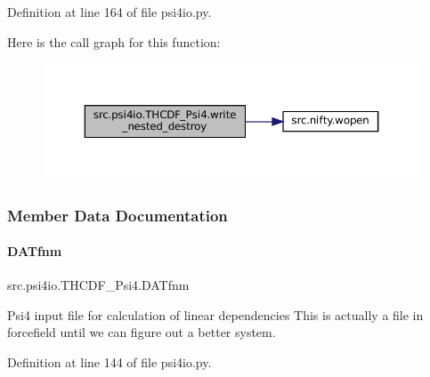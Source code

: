 Definition at line 164 of file psi4io.\+py.

Here is the call graph for this function\+:
\nopagebreak
\begin{figure}[H]
\begin{center}
\leavevmode
\includegraphics[width=350pt]{classsrc_1_1psi4io_1_1THCDF__Psi4_a4fb94880d038f875460abd67e18bdf43_cgraph}
\end{center}
\end{figure}


\subsubsection{Member Data Documentation}
\mbox{\label{classsrc_1_1psi4io_1_1THCDF__Psi4_a25b5e4a9c2d9d771d419fcdf0803a08a}} 
\paragraph{\texorpdfstring{D\+A\+Tfnm}{DATfnm}}
{\footnotesize\ttfamily src.\+psi4io.\+T\+H\+C\+D\+F\+\_\+\+Psi4.\+D\+A\+Tfnm}



Psi4 input file for calculation of linear dependencies This is actually a file in \textquotesingle{}forcefield\textquotesingle{} until we can figure out a better system. 



Definition at line 144 of file psi4io.\+py.

\mbox{\label{classsrc_1_1psi4io_1_1THCDF__Psi4_a9991811b534a0015ad2eb6e5a2b4f477}} 
